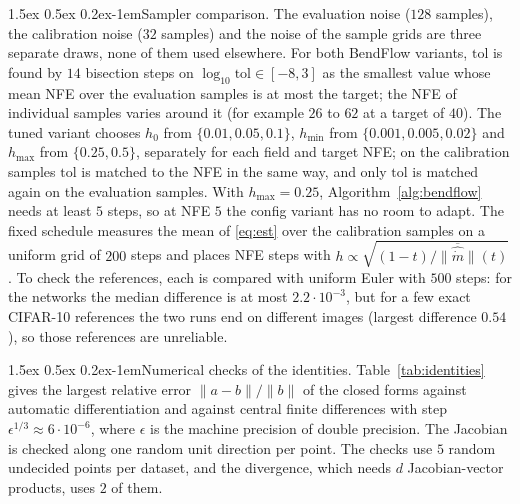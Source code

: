 \documentclass{article}
\makeatletter
\renewcommand{\normalsize}{\fontsize{10pt}{11pt}\selectfont}
\renewcommand{\paragraph}{\@startsection{paragraph}{4}{\z@}%
  {1.5ex \@plus 0.5ex \@minus 0.2ex}{-1em}{\normalsize\bfseries}}
\theoremstyle{remark}
\newcommand{\tol}{\mathrm{tol}}
\makeatother
\begin{document}
\paragraph{Sampler comparison.} The evaluation noise ($128$ samples), the calibration noise ($32$ samples) and the noise of the sample grids are three separate draws, none of them used elsewhere. For both BendFlow variants, $\tol$ is found by $14$ bisection steps on $\log_{10}\tol \in [-8, 3]$ as the smallest value whose mean NFE over the evaluation samples is at most the target; the NFE of individual samples varies around it (for example $26$ to $62$ at a target of $40$). The tuned variant chooses $h_0$ from $\{0.01, 0.05, 0.1\}$, $h_{\min}$ from $\{0.001, 0.005, 0.02\}$ and $h_{\max}$ from $\{0.25, 0.5\}$, separately for each field and target NFE; on the calibration samples $\tol$ is matched to the NFE in the same way, and only $\tol$ is matched again on the evaluation samples. With $h_{\max} = 0.25$, Algorithm~\ref{alg:bendflow} needs at least $5$ steps, so at NFE $5$ the config variant has no room to adapt. The fixed schedule measures the mean of \eqref{eq:est} over the calibration samples on a uniform grid of $200$ steps and places NFE steps with $h \propto \sqrt{(1 - t)/\overline{\|\widehat{\dot m}\|}(t)}$. To check the references, each is compared with uniform Euler with $500$ steps: for the networks the median difference is at most $2.2 \cdot 10^{-3}$, but for a few exact CIFAR-10 references the two runs end on different images (largest difference $0.54$), so those references are unreliable.

\paragraph{Numerical checks of the identities.} Table~\ref{tab:identities} gives the largest relative error $\|a - b\| / \|b\|$ of the closed forms against automatic differentiation and against central finite differences with step $\epsilon^{1/3} \approx 6 \cdot 10^{-6}$, where $\epsilon$ is the machine precision of double precision. The Jacobian is checked along one random unit direction per point. The checks use $5$ random undecided points per dataset, and the divergence, which needs $d$ Jacobian-vector products, uses $2$ of them.
\end{document}
